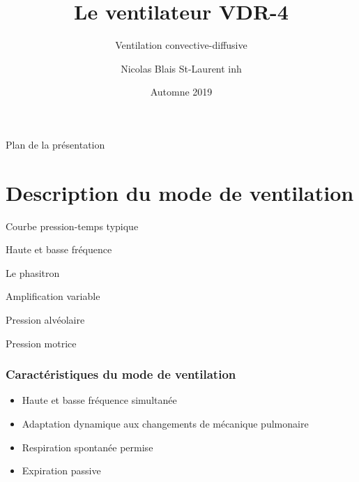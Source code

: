 \documentclass[aspectratio=169]{beamer}
\title{Le ventilateur VDR-4}
\subtitle{Ventilation convective-diffusive}
\author{Nicolas Blais St-Laurent \tiny{inh}}
\institute{Service d'inhalothérapie}
\date{Automne 2019}
\begin{document}
\begin{frame}
\maketitle
\end{frame}

\begin{frame}{Plan de la présentation}
\tableofcontents
\end{frame}

\section{Description du mode de ventilation}

\begin{frame}{Courbe pression-temps typique}
	\centering
	
\end{frame}

\begin{frame}{Haute et basse fréquence}
	
\end{frame}

\begin{frame}{Le phasitron}
	
\end{frame}

\begin{frame}{Amplification variable}
	
\end{frame}

\begin{frame}{Pression alvéolaire}
	\centering
	
\end{frame}

\begin{frame}{Pression motrice}
	\centering
	
\end{frame}

\begin{frame}
	\frametitle{Caractéristiques du mode de ventilation}
	\begin{itemize}
		\item Haute et basse fréquence simultanée
		\item Adaptation dynamique aux changements de mécanique pulmonaire
		\item Respiration spontanée permise
		\item Expiration passive
	\end{itemize}
\end{frame}
\end{document}
